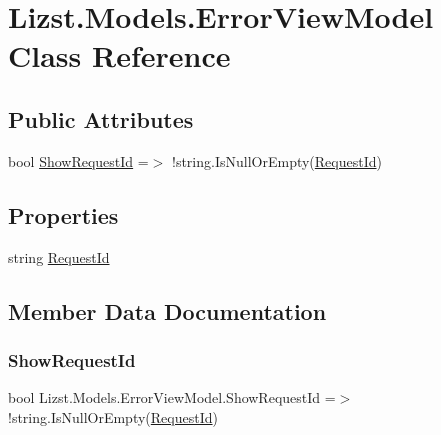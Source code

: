\hypertarget{class_lizst_1_1_models_1_1_error_view_model}{}\section{Lizst.\+Models.\+Error\+View\+Model Class Reference}
\label{class_lizst_1_1_models_1_1_error_view_model}
\subsection*{Public Attributes}
\begin{DoxyCompactItemize}
\item 
bool \mbox{\hyperlink{class_lizst_1_1_models_1_1_error_view_model_a6199698019a15fe3df9d2a59d3827a55}{Show\+Request\+Id}} =$>$ !string.\+Is\+Null\+Or\+Empty(\mbox{\hyperlink{class_lizst_1_1_models_1_1_error_view_model_a7f1fd47c09e7070153c80e5fa38cfcb3}{Request\+Id}})
\end{DoxyCompactItemize}
\subsection*{Properties}
\begin{DoxyCompactItemize}
\item 
string \mbox{\hyperlink{class_lizst_1_1_models_1_1_error_view_model_a7f1fd47c09e7070153c80e5fa38cfcb3}{Request\+Id}}
\end{DoxyCompactItemize}


\subsection{Member Data Documentation}
\mbox{\label{class_lizst_1_1_models_1_1_error_view_model_a6199698019a15fe3df9d2a59d3827a55}} 
\subsubsection{\texorpdfstring{ShowRequestId}{ShowRequestId}}
{\footnotesize\ttfamily bool Lizst.\+Models.\+Error\+View\+Model.\+Show\+Request\+Id =$>$ !string.\+Is\+Null\+Or\+Empty(\mbox{\hyperlink{class_lizst_1_1_models_1_1_error_view_model_a7f1fd47c09e7070153c80e5fa38cfcb3}{Request\+Id}})}



